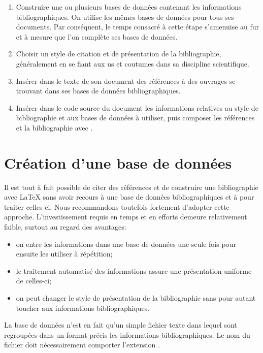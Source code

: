 \begin{enumerate}
\item Construire une ou plusieurs bases de données contenant les
  informations bibliographiques. On utilise les mêmes bases de données
  pour tous ses documents. Par conséquent, le temps consacré à cette
  étape s'amenuise au fur et à mesure que l'on complète ses bases de
  données.
\item Choisir un style de citation et de présentation de la
  bibliographie, généralement en se fiant aux us et coutumes dans sa
  discipline scientifique.
\item Insérer dans le texte de son document des références à des
  ouvrages se trouvant dans ses bases de données bibliographiques.
\item Insérer dans le code source du document les informations
  relatives au style de bibliographie et aux bases de données à
  utiliser, puis composer les références et la bibliographie avec
  {\BibTeX}.
\end{enumerate}


\section{Création d'une base de données}
\label{sec:bibliographie:bib}

Il est tout à fait possible de citer des références et de construire
une bibliographie avec {\LaTeX} sans avoir recours à une base de
données bibliographiques et à {\BibTeX} pour traiter celles-ci. Nous
recommandons toutefois fortement d'adopter cette approche.
L'investissement requis en temps et en efforts demeure relativement
faible, surtout au regard des avantages:
\begin{itemize}
\item on entre les informations dans une base de données une seule
  fois pour ensuite les utiliser à répétition;
\item le traitement automatisé des informations assure une
  présentation uniforme de celles-ci;
\item on peut changer le style de présentation de la bibliographie
  sans pour autant toucher aux informations bibliographiques.
\end{itemize}

La base de données n'est en fait qu'un simple fichier texte dans
lequel sont regroupées dans un format précis les informations
bibliographiques. Le nom du fichier doit nécessairement comporter
l'extension .

